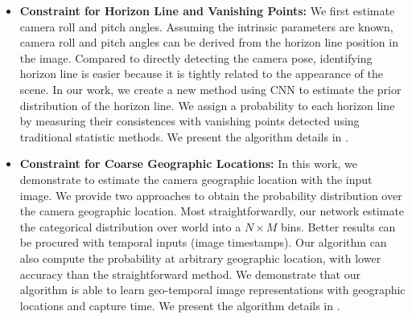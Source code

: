 \begin{itemize}[noitemsep]
  \item \textbf{Constraint for Horizon Line and Vanishing Points:}
  We first estimate camera roll and pitch angles. Assuming the intrinsic
  parameters are known, camera roll and pitch angles can be
  derived from the horizon line position in the image. Compared to
  directly detecting the camera pose, identifying horizon line is easier
  because it is tightly related to the appearance
  of the scene. In our work, we create a new method using CNN to
  estimate the prior distribution of the horizon line. We assign
  a probability to each horizon line by measuring their consistences
  with vanishing points detected using traditional statistic methods.
  We present the algorithm details in .
  \newline

  \item \textbf{Constraint for Coarse Geographic Locations:}
  In this work, we demonstrate to estimate the camera geographic
  location with the input image.
  We provide two approaches to obtain the probability distribution over the camera
  geographic location. Most straightforwardly, our network estimate the
  categorical distribution over world into a $N \times M$ bins. Better
  results can be procured with temporal inputs (image timestamps).
  Our algorithm can also compute the probability at arbitrary
  geographic location, with lower accuracy than the straightforward
  method.
  We demonstrate that our algorithm is able to learn geo-temporal
  image representations with geographic locations and capture
  time.
  We present the algorithm details in .
  \newline


\end{itemize}
